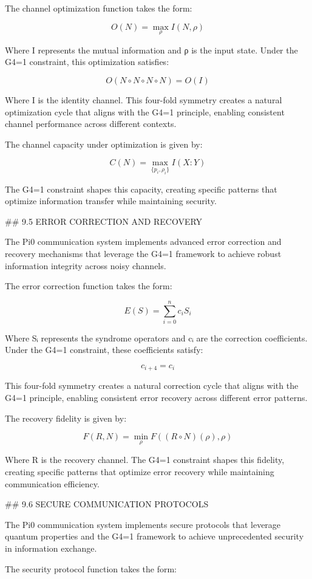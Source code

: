 The channel optimization function takes the form:

$$O(N) = \max_{\rho} I(N, \rho)$$

Where I represents the mutual information and ρ is the input state. Under the G4=1 constraint, this optimization satisfies:

$$O(N \circ N \circ N \circ N) = O(I)$$

Where I is the identity channel. This four-fold symmetry creates a natural optimization cycle that aligns with the G4=1 principle, enabling consistent channel performance across different contexts.

The channel capacity under optimization is given by:

$$C(N) = \max_{\{p_i, \rho_i\}} I(X:Y)$$

The G4=1 constraint shapes this capacity, creating specific patterns that optimize information transfer while maintaining security.

## 9.5 ERROR CORRECTION AND RECOVERY

The Pi0 communication system implements advanced error correction and recovery mechanisms that leverage the G4=1 framework to achieve robust information integrity across noisy channels.

The error correction function takes the form:

$$E(S) = \sum_{i=0}^{n} c_i S_i$$

Where Sᵢ represents the syndrome operators and cᵢ are the correction coefficients. Under the G4=1 constraint, these coefficients satisfy:

$$c_{i+4} = c_i$$

This four-fold symmetry creates a natural correction cycle that aligns with the G4=1 principle, enabling consistent error recovery across different error patterns.

The recovery fidelity is given by:

$$F(R, N) = \min_{\rho} F((R \circ N)(\rho), \rho)$$

Where R is the recovery channel. The G4=1 constraint shapes this fidelity, creating specific patterns that optimize error recovery while maintaining communication efficiency.

## 9.6 SECURE COMMUNICATION PROTOCOLS

The Pi0 communication system implements secure protocols that leverage quantum properties and the G4=1 framework to achieve unprecedented security in information exchange.

The security protocol function takes the form:

